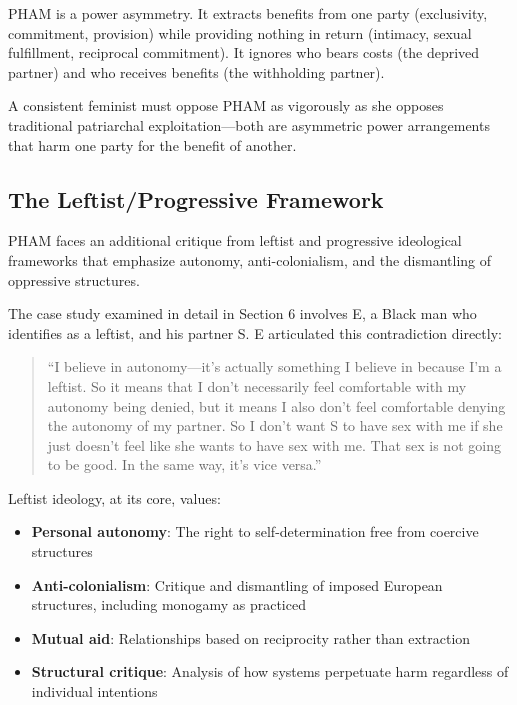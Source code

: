\documentclass[12pt,openany]{book}
\numberwithin{equation}{chapter}
\begin{document}
PHAM is a power asymmetry. It extracts benefits from one party (exclusivity, commitment, provision) while providing nothing in return (intimacy, sexual fulfillment, reciprocal commitment). It ignores who bears costs (the deprived partner) and who receives benefits (the withholding partner).

A consistent feminist must oppose PHAM as vigorously as she opposes traditional patriarchal exploitation---both are asymmetric power arrangements that harm one party for the benefit of another.

\subsection{The Leftist/Progressive Framework}

PHAM faces an additional critique from leftist and progressive ideological frameworks that emphasize autonomy, anti-colonialism, and the dismantling of oppressive structures.

The case study examined in detail in Section 6 involves E, a Black man who identifies as a leftist, and his partner S. E articulated this contradiction directly:

\begin{quote}
``I believe in autonomy---it's actually something I believe in because I'm a leftist. So it means that I don't necessarily feel comfortable with my autonomy being denied, but it means I also don't feel comfortable denying the autonomy of my partner. So I don't want S to have sex with me if she just doesn't feel like she wants to have sex with me. That sex is not going to be good. In the same way, it's vice versa.''
\end{quote}

Leftist ideology, at its core, values:

\begin{itemize}
    \item \textbf{Personal autonomy}: The right to self-determination free from coercive structures
    \item \textbf{Anti-colonialism}: Critique and dismantling of imposed European structures, including monogamy as practiced
    \item \textbf{Mutual aid}: Relationships based on reciprocity rather than extraction
    \item \textbf{Structural critique}: Analysis of how systems perpetuate harm regardless of individual intentions
\end{itemize}
\end{document}

